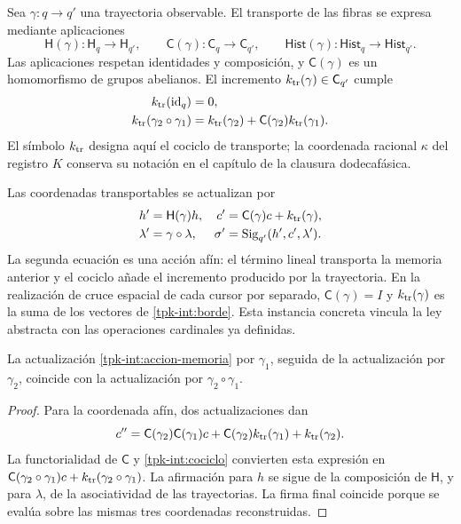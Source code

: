 Sea \(\gamma:q\to q'\) una trayectoria observable. El transporte
de las fibras se expresa mediante aplicaciones
\[
 \mathsf H(\gamma):\mathsf H_q\to\mathsf H_{q'},\qquad
 \mathsf C(\gamma):\mathsf C_q\to\mathsf C_{q'},\qquad
 \mathsf{Hist}(\gamma):\mathsf{Hist}_q\to\mathsf{Hist}_{q'}.
\]
Las aplicaciones respetan identidades y composición, y
\(\mathsf C(\gamma)\) es un homomorfismo de grupos abelianos.
El incremento \(k_{\rm tr}(\gamma)\in\mathsf C_{q'}\) cumple
\begin{equation}
 \begin{split}
 k_{\rm tr}(\operatorname{id}_q)&=0,\\
 k_{\rm tr}(\gamma_2\circ\gamma_1)
 &=k_{\rm tr}(\gamma_2)+
   \mathsf C(\gamma_2)k_{\rm tr}(\gamma_1).
 \end{split}
 \label{tpk-int:cociclo}
\end{equation}
El símbolo \(k_{\rm tr}\) designa aquí el cociclo de transporte;
la coordenada racional \(\kappa\) del registro \(K\) conserva
su notación en el capítulo de la clausura dodecafásica.

Las coordenadas transportables se actualizan por
\begin{equation}
 \begin{aligned}
 h'&=\mathsf H(\gamma)h,&
 c'&=\mathsf C(\gamma)c+k_{\rm tr}(\gamma),\\
 \lambda'&=\gamma\circ\lambda,&
 \sigma'&=\operatorname{Sig}_{q'}(h',c',\lambda').
 \end{aligned}
 \label{tpk-int:accion-memoria}
\end{equation}
La segunda ecuación es una acción afín: el término lineal transporta
la memoria anterior y el cociclo añade el incremento producido por la
trayectoria. En la realización de cruce espacial de cada cursor por separado,
\(\mathsf C(\gamma)=I\) y \(k_{\rm tr}(\gamma)\) es la suma
de los vectores de \eqref{tpk-int:borde}. Esta instancia concreta
vincula la ley abstracta con las operaciones cardinales ya definidas.

\begin{proposition}
\label{tpk-int:composicion-memoria}
La actualización \eqref{tpk-int:accion-memoria} por
\(\gamma_1\), seguida de la actualización por \(\gamma_2\),
coincide con la actualización por \(\gamma_2\circ\gamma_1\).
\end{proposition}
\begin{proof}
Para la coordenada afín, dos actualizaciones dan
\[
 c''=\mathsf C(\gamma_2)\mathsf C(\gamma_1)c
       +\mathsf C(\gamma_2)k_{\rm tr}(\gamma_1)
       +k_{\rm tr}(\gamma_2).
\]
La functorialidad de \(\mathsf C\) y
\eqref{tpk-int:cociclo} convierten esta expresión en
\(\mathsf C(\gamma_2\circ\gamma_1)c+
k_{\rm tr}(\gamma_2\circ\gamma_1)\).
La afirmación para \(h\) se sigue de la composición de
\(\mathsf H\), y para \(\lambda\), de la asociatividad de las
trayectorias. La firma final coincide porque se evalúa sobre las mismas
tres coordenadas reconstruidas.
\end{proof}

